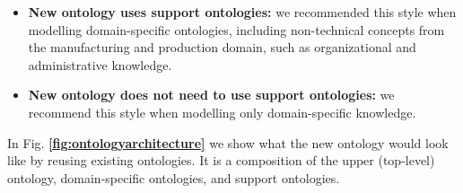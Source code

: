 \documentclass{guideline/sty/rapport}
\begin{document}
\begin{itemize}
    \item \textbf{New ontology uses support ontologies:} we recommended this style when modelling domain-specific ontologies, including non-technical concepts from the manufacturing and production domain, such as organizational and administrative knowledge. \label{item:supportontologiesused}
    \item \textbf{New ontology does not need to use support ontologies:} we recommend this style when modelling only domain-specific knowledge. \label{item:supportontologiesnotused}
\end{itemize} \singlespacing

In Fig. \textbf{\ref{fig:ontologyarchitecture}} we show what the new ontology would look like by reusing existing ontologies. It is a composition of the upper (top-level) ontology, domain-specific ontologies, and support ontologies.
\end{document}
